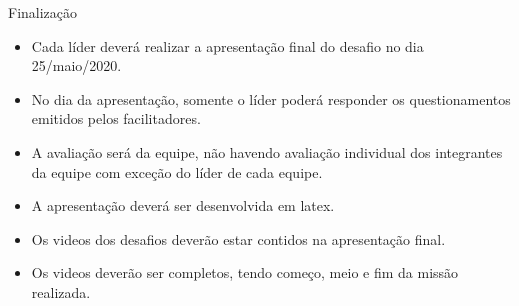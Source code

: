 \begin{frame}[t]{Finalização}
    \begin{itemize}
        \item Cada líder deverá realizar a apresentação final do desafio no dia 25/maio/2020.
        \item No dia da apresentação, somente o líder poderá responder os questionamentos emitidos pelos facilitadores.
        \item A avaliação será da equipe, não havendo avaliação individual dos integrantes da equipe com exceção do líder de cada equipe.
        \item A apresentação deverá ser desenvolvida em latex.
        \item Os videos dos desafios deverão estar contidos na apresentação final.
        \item Os videos deverão ser completos, tendo começo, meio e fim da missão realizada.
    \end{itemize}
\end{frame}
